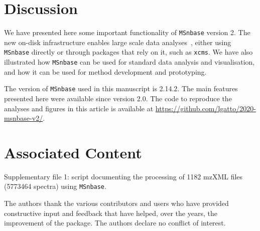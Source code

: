 \documentclass[journal=jacsat,manuscript=article]{achemso}\usepackage[]{graphicx}\usepackage[]{color}
\begin{document}
\section{Discussion}

We have presented here some important functionality of
\texttt{MSnbase} version 2. The new on-disk infrastructure enables
large scale data analyses~\cite{Nothias:2020}, either using
\texttt{MSnbase} directly or through packages that rely on it, such as
\texttt{xcms}. We have also illustrated how \texttt{MSnbase} can be
used for standard data analysis and visualisation, and how it can be
used for method development and prototyping.





The version of \texttt{MSnbase} used in this manuscript is
2.14.2. The main features presented here were available since
version 2.0. The code to reproduce the analyses and figures in this
article is available at
\url{https://github.com/lgatto/2020-msnbase-v2/}.

\section{Associated Content}

Supplementary file 1: script documenting the processing of 1182 mzXML
files (5773464 spectra) using \texttt{MSnbase}.


\begin{acknowledgement}

The authors thank the various contributors and users who have provided
constructive input and feedback that have helped, over the years, the
improvement of the package. The authors declare no conflict of
interest.

\end{acknowledgement}




\end{document}
